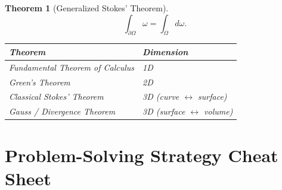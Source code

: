 \documentclass[12pt,a4paper]{article}
\newtheorem{theorem}{Theorem}[section]
\theoremstyle{definition}
\theoremstyle{remark}
\begin{document}
\begin{theorem}[Generalized Stokes' Theorem]
\[
  \int_{\partial\Omega}\omega = \int_\Omega d\omega.
\]
\begin{center}
\begin{tabular}{ll}
\toprule
Theorem & Dimension \\
\midrule
Fundamental Theorem of Calculus & 1D \\
Green's Theorem & 2D \\
Classical Stokes' Theorem & 3D (curve $\leftrightarrow$ surface) \\
Gauss / Divergence Theorem & 3D (surface $\leftrightarrow$ volume) \\
\bottomrule
\end{tabular}
\end{center}
\end{theorem}

\section*{Problem-Solving Strategy Cheat Sheet}
\end{document}
